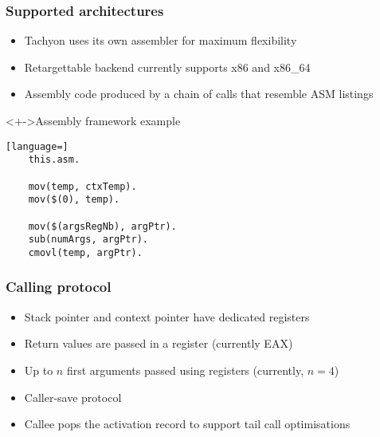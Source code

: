 \begin{frame}[fragile]
\frametitle{\bf Supported architectures}

\begin{itemize}
    \item Tachyon uses its own assembler for maximum flexibility
    \item Retargettable backend currently supports x86 and x86\_64
    \item Assembly code produced by a chain of calls that resemble ASM
    listings
\end{itemize}

\begin{block}<+->{Assembly framework example}
\begin{lstlisting}[language=]
    this.asm.

    mov(temp, ctxTemp).
    mov($(0), temp).
    
    mov($(argsRegNb), argPtr).
    sub(numArgs, argPtr).
    cmovl(temp, argPtr).
\end{lstlisting}
\end{block}
\end{frame}

\begin{frame}
\frametitle{\bf Calling protocol}

\begin{itemize}
    \item Stack pointer and context pointer have dedicated registers
    \item Return values are passed in a register (currently EAX)
    \item Up to $n$ first arguments passed using registers (currently, $n =
    4$)
    \item Caller-save protocol
    \item Callee pops the activation record to support tail call optimisations
\end{itemize}
\end{frame}

